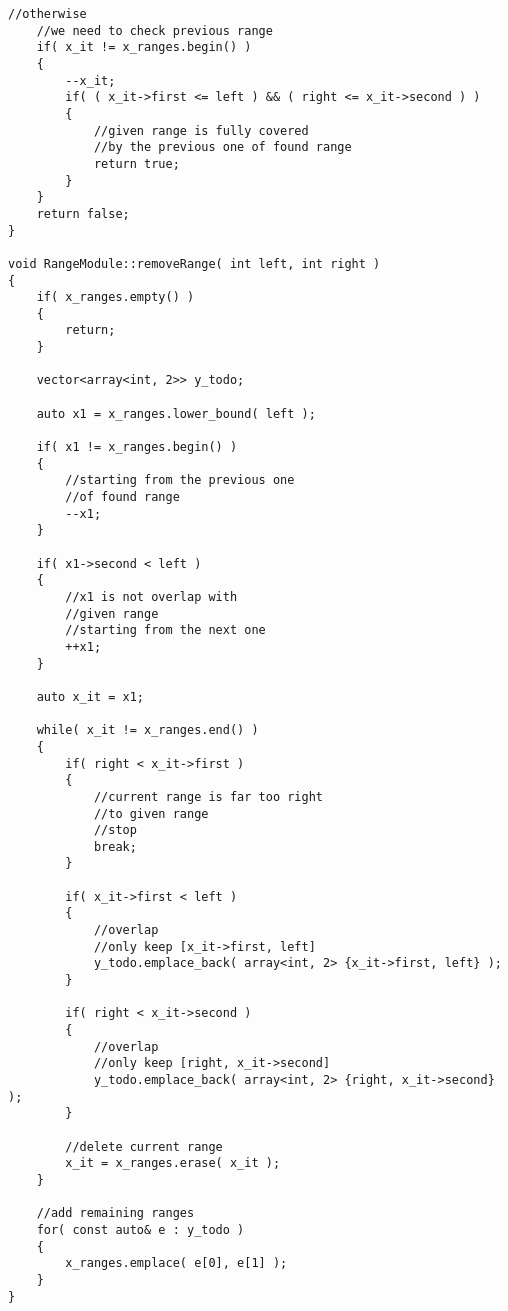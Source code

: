 \begin{lstlisting}[style=customc, caption={Disjoint Sorted Intervals}]
    //otherwise
    //we need to check previous range
    if( x_it != x_ranges.begin() )
    {
        --x_it;
        if( ( x_it->first <= left ) && ( right <= x_it->second ) )
        {
            //given range is fully covered
            //by the previous one of found range
            return true;
        }
    }
    return false;
}

void RangeModule::removeRange( int left, int right )
{
    if( x_ranges.empty() )
    {
        return;
    }

    vector<array<int, 2>> y_todo;

    auto x1 = x_ranges.lower_bound( left );

    if( x1 != x_ranges.begin() )
    {
        //starting from the previous one
        //of found range
        --x1;
    }

    if( x1->second < left )
    {
        //x1 is not overlap with
        //given range
        //starting from the next one
        ++x1;
    }

    auto x_it = x1;

    while( x_it != x_ranges.end() )
    {
        if( right < x_it->first )
        {
            //current range is far too right
            //to given range
            //stop
            break;
        }

        if( x_it->first < left )
        {
            //overlap
            //only keep [x_it->first, left]
            y_todo.emplace_back( array<int, 2> {x_it->first, left} );
        }

        if( right < x_it->second )
        {
            //overlap
            //only keep [right, x_it->second]
            y_todo.emplace_back( array<int, 2> {right, x_it->second} );
        }

        //delete current range
        x_it = x_ranges.erase( x_it );
    }

    //add remaining ranges
    for( const auto& e : y_todo )
    {
        x_ranges.emplace( e[0], e[1] );
    }
}
\end{lstlisting}